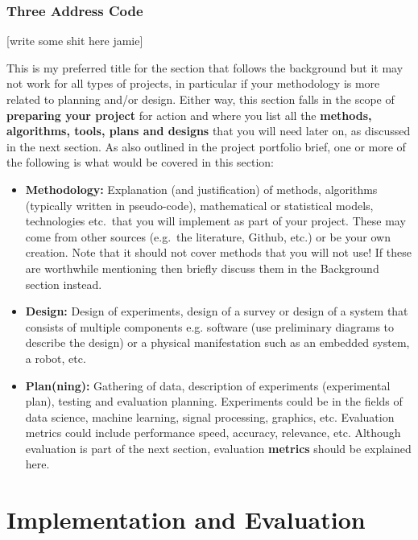 \documentclass[final]{cmpreport_02}
\begin{document}
\subsubsection{Three Address Code}
[write some shit here jamie]




This is my preferred title for the section that follows the background but it may not work for all types of projects, in particular if your methodology is more related to planning and/or design. Either way, this section falls in the scope of \textbf{preparing your project} for action and where you list all the \textbf{methods, algorithms, tools, plans and designs} that you will need later on, as discussed in the next section. As also outlined in the project portfolio brief, one or more of the following is what would be covered in this section:

\begin{itemize}
\item \textbf{Methodology: } Explanation (and justification) of methods, algorithms (typically written in pseudo-code), mathematical or statistical models, technologies etc.\ that you will implement as part of your project. These may come from other sources (e.g.\ the literature, Github, etc.) or be your own creation. Note that it should not cover methods that you will not use! If these are worthwhile mentioning then briefly discuss them in the Background section instead.
\item \textbf{Design: } Design of experiments, design of a survey or design of a system that consists of multiple components e.g. software (use preliminary diagrams to describe the design) or a physical manifestation such as an embedded system, a robot, etc.
\item \textbf{Plan(ning): } Gathering of data, description of experiments (experimental plan), testing and evaluation planning. Experiments could be in the fields of data science, machine learning, signal processing, graphics, etc. Evaluation metrics could include performance speed, accuracy, relevance, etc. Although evaluation is part of the next section, evaluation \textbf{metrics} should be explained here.
\end{itemize}

\section{Implementation and Evaluation}
\end{document}
